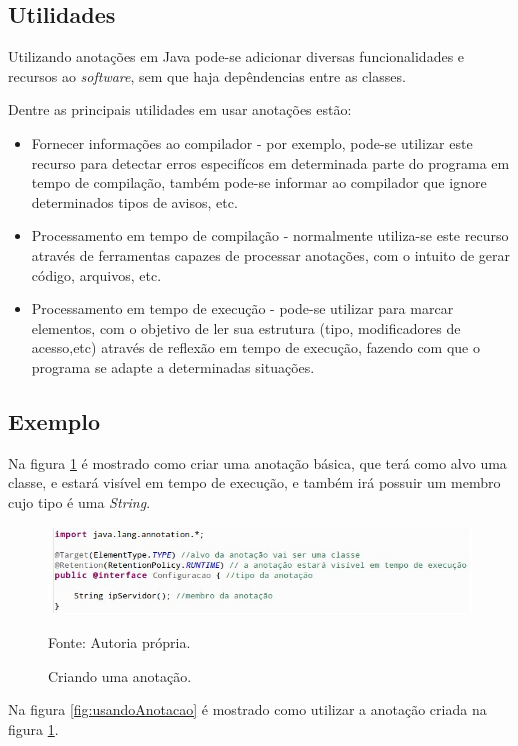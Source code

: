 \documentclass[tc,openright]{iiufrgs}
\begin{document}
\subsection{Utilidades}

Utilizando anotações em Java pode-se adicionar diversas funcionalidades e recursos ao \textit{software}, sem que haja depêndencias entre as classes.

 Dentre as principais utilidades em usar anotações estão:

\begin{itemize}
\item Fornecer informações ao compilador - por exemplo, pode-se utilizar este recurso para detectar erros especifícos em determinada parte do programa em tempo de compilação, também pode-se informar ao compilador que ignore determinados tipos de avisos, etc.
\item Processamento em tempo de compilação - normalmente utiliza-se este recurso através de ferramentas capazes de processar anotações, com o intuito de gerar código, arquivos, etc. 
\item Processamento em tempo de execução - pode-se utilizar para marcar elementos, com o objetivo de ler sua estrutura (tipo, modificadores de acesso,etc) através de reflexão em tempo de execução, fazendo com que o programa se adapte a determinadas situações.
\end{itemize}
\subsection{Exemplo}

Na figura \ref{fig:criandoAnotacao} é mostrado como criar uma anotação básica, que terá como alvo uma classe, e estará visível em tempo de execução, e também irá possuir um membro cujo tipo é uma \textit{String}.

\begin{figure}[ht]
	\centering
	\includegraphics[scale=0.6]{figuras/criandoAnnotation.jpg}
	\caption{Criando uma anotação.}
	\small{Fonte: Autoria própria.}
	\label{fig:criandoAnotacao}
\end{figure}

Na figura \ref{fig:usandoAnotacao} é mostrado como utilizar a anotação criada na figura \ref{fig:criandoAnotacao}.
\end{document}
